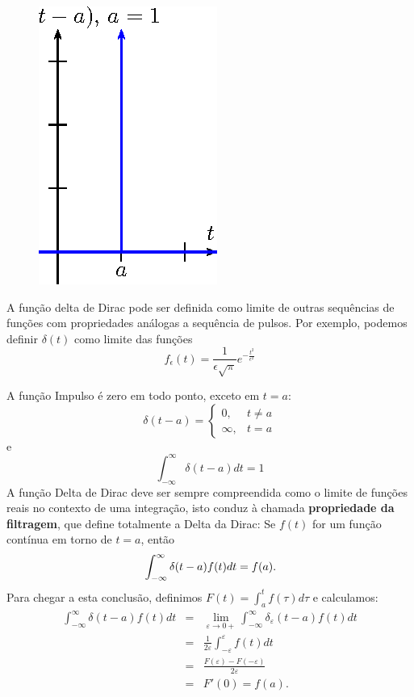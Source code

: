 \begin{figure}[!ht]
\begin{center}
\includegraphics{cap_dirac_conv/pics/figura_6}
\end{center}
\caption{\label{fig_delta_dirac}}
\end{figure}
\begin{obs}A função delta de Dirac pode ser definida como limite de outras sequências de funções com propriedades análogas a sequência de pulsos. Por exemplo, podemos definir $\delta(t)$ como limite das funções
\begin{equation}
f_\epsilon(t)=\frac{1}{\epsilon\sqrt{\pi}}e^{-\frac{t^2}{\epsilon^2}}
\end{equation}
\end{obs}
A função Impulso é zero em todo ponto, exceto em $t=a$:
\begin{equation}
\delta(t-a)=\left\{\begin{array}{ll}0,&t\neq a\\\infty,&t=a  \end{array}\right.
\end{equation}
e
\begin{equation}
\int_{-\infty}^\infty\delta(t-a)dt=1
\end{equation}
A função Delta de Dirac deve ser sempre compreendida como o limite de funções reais no contexto de uma integração, isto conduz à chamada  {\bf propriedade da filtragem}, que define totalmente a Delta da Dirac:
Se $f(t)$ for um função contínua em torno de $t=a$, então
\begin{equation}{\label{prop_filtragem_dirac}}
\int_{-\infty}^\infty \delta(t-a)f(t)dt=f(a). 
\end{equation}
Para chegar a esta conclusão, definimos $F(t)=\int_a^t f(\tau)d\tau$ e calculamos:
\begin{eqnarray*}
\int_{-\infty}^\infty \delta(t-a)f(t)dt&=&\lim_{\varepsilon\to 0+}
\int_{-\infty}^\infty \delta_\varepsilon(t-a)f(t)dt\\
&=&\frac{1}{2\varepsilon}\int_{-\varepsilon}^\varepsilon f(t)dt\\
&=&\frac{F(\varepsilon)-F(-\varepsilon)}{2\varepsilon}\\
&=&F'(0)=f(a).
\end{eqnarray*}

